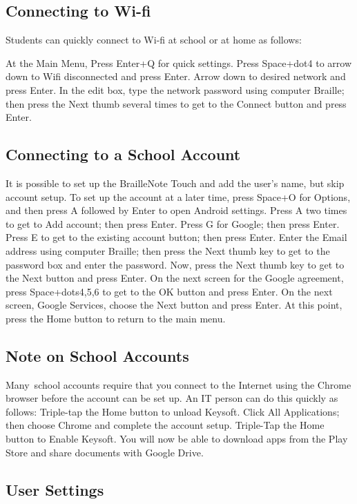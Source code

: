 \documentclass[10pt,letterpaper,twoside]{report}
\begin{document}
{{{\subsection{Connecting to Wi-fi}

Students can quickly connect to Wi-fi at school or at home as follows:

At the Main Menu, Press Enter+Q for quick settings.
Press Space+dot4 to arrow down to Wifi disconnected and press Enter.
Arrow down to desired network and press Enter.
In the edit box, type the network password using computer Braille; then press the Next thumb several times to get to the Connect button and press Enter.

\subsection{Connecting to a School Account}

It is possible to set up the BrailleNote Touch and add the user's name, but skip account setup. To set up the account at a later time, press Space+O for Options, and then press A followed by Enter to open Android settings.
Press A two times to get to Add account; then press Enter.
Press G for Google; then press Enter.
Press E to get to the existing account button; then press Enter.
Enter the Email address using computer Braille; then press the Next thumb key to get to the password box and enter the password. Now, press the Next thumb key to get to the Next button and press Enter. On the next screen for the Google agreement, press Space+dots4,5,6 to get to the OK button and press Enter. On the next screen, Google Services, choose the Next button and press Enter.
At this point, press the Home button to return to the main menu.

\subsection{Note on School Accounts}

Many\ school accounts  require that you connect to the Internet using the Chrome browser before the account can be set up. An IT person can do this quickly as follows:
Triple-tap the Home button to unload Keysoft.
Click All Applications; then choose Chrome and complete the account setup.
Triple-Tap the Home button to Enable Keysoft.
You will now be able to download apps from the Play Store and share documents with Google Drive.
 
\subsection{User Settings}

}}}
\end{document}
